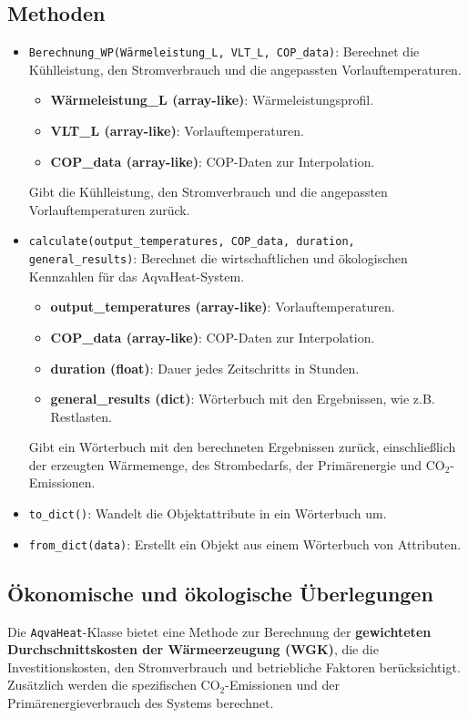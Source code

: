 \subsection{Methoden}
\begin{itemize}
    \item \texttt{Berechnung\_WP(Wärmeleistung\_L, VLT\_L, COP\_data)}: Berechnet die Kühlleistung, den Stromverbrauch und die angepassten Vorlauftemperaturen.
    \begin{itemize}
        \item \textbf{Wärmeleistung\_L (array-like)}: Wärmeleistungsprofil.
        \item \textbf{VLT\_L (array-like)}: Vorlauftemperaturen.
        \item \textbf{COP\_data (array-like)}: COP-Daten zur Interpolation.
    \end{itemize}
    Gibt die Kühlleistung, den Stromverbrauch und die angepassten Vorlauftemperaturen zurück.

    \item \texttt{calculate(output\_temperatures, COP\_data, duration, general\_results)}: Berechnet die wirtschaftlichen und ökologischen Kennzahlen für das AqvaHeat-System.
    \begin{itemize}
        \item \textbf{output\_temperatures (array-like)}: Vorlauftemperaturen.
        \item \textbf{COP\_data (array-like)}: COP-Daten zur Interpolation.
        \item \textbf{duration (float)}: Dauer jedes Zeitschritts in Stunden.
        \item \textbf{general\_results (dict)}: Wörterbuch mit den Ergebnissen, wie z.B. Restlasten.
    \end{itemize}
    Gibt ein Wörterbuch mit den berechneten Ergebnissen zurück, einschließlich der erzeugten Wärmemenge, des Strombedarfs, der Primärenergie und CO$_2$-Emissionen.

    \item \texttt{to\_dict()}: Wandelt die Objektattribute in ein Wörterbuch um.

    \item \texttt{from\_dict(data)}: Erstellt ein Objekt aus einem Wörterbuch von Attributen.
\end{itemize}

\subsection{Ökonomische und ökologische Überlegungen}
Die \texttt{AqvaHeat}-Klasse bietet eine Methode zur Berechnung der \textbf{gewichteten Durchschnittskosten der Wärmeerzeugung (WGK)}, die die Investitionskosten, den Stromverbrauch und betriebliche Faktoren berücksichtigt. Zusätzlich werden die spezifischen CO$_2$-Emissionen und der Primärenergieverbrauch des Systems berechnet.


